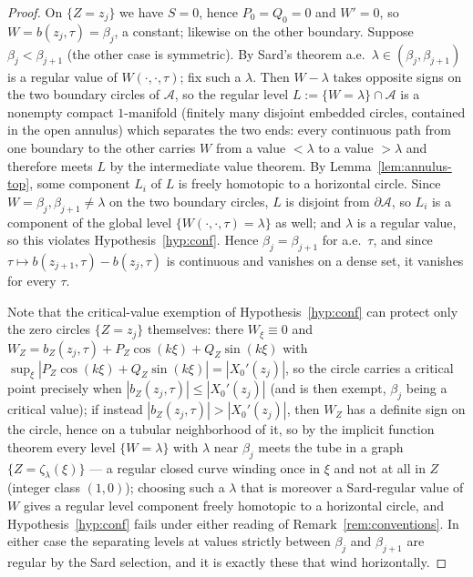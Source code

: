 \documentclass[11pt]{amsart}
\theoremstyle{definition}
\theoremstyle{remark}
\begin{document}
\begin{proof}
On $\{Z=z_j\}$ we have $S=0$, hence $P_0=Q_0=0$ and $W'=0$, so
$W=b(z_j,\tau)=\beta_j$, a constant; likewise on the other boundary.
Suppose $\beta_j<\beta_{j+1}$ (the other case is symmetric). By Sard's
theorem a.e.\ $\lambda\in(\beta_j,\beta_{j+1})$ is a regular value of
$W(\cdot,\cdot,\tau)$; fix such a $\lambda$. Then $W-\lambda$ takes
opposite signs on the two boundary circles of $\mathcal A$, so the
regular level $L:=\{W=\lambda\}\cap\mathcal A$ is a nonempty compact
$1$-manifold (finitely many disjoint embedded circles, contained in the
open annulus) which separates the two ends: every continuous path from
one boundary to the other carries $W$ from a value $<\lambda$ to a
value $>\lambda$ and therefore meets $L$ by the intermediate value
theorem. By Lemma~\ref{lem:annulus-top}, some component $L_i$ of $L$ is
freely homotopic to a horizontal circle. Since $W=\beta_j,\beta_{j+1}
\neq\lambda$ on the two boundary circles, $L$ is disjoint from
$\partial\mathcal A$, so $L_i$ is a component of the global level
$\{W(\cdot,\cdot,\tau)=\lambda\}$ as well; and $\lambda$ is a
regular value, so this violates Hypothesis~\ref{hyp:conf}. Hence
$\beta_j=\beta_{j+1}$ for a.e.\ $\tau$, and since
$\tau\mapsto b(z_{j+1},\tau)-b(z_j,\tau)$ is continuous and vanishes on
a dense set, it vanishes for every $\tau$.

Note that the critical-value exemption of Hypothesis~\ref{hyp:conf} can
protect only the zero circles $\{Z=z_j\}$ themselves: there
$W_\xi\equiv0$ and
$W_Z=b_Z(z_j,\tau)+P_Z\cos(k\xi)+Q_Z\sin(k\xi)$ with
$\sup_\xi|P_Z\cos(k\xi)+Q_Z\sin(k\xi)|=|X_0'(z_j)|$, so the circle
carries a critical point precisely when
$|b_Z(z_j,\tau)|\le|X_0'(z_j)|$ (and is then exempt, $\beta_j$ being a
critical value); if instead $|b_Z(z_j,\tau)|>|X_0'(z_j)|$, then $W_Z$
has a definite sign on the circle, hence on a tubular neighborhood of
it, so by the implicit function theorem every level $\{W=\lambda\}$
with $\lambda$ near $\beta_j$ meets the tube in a graph
$\{Z=\zeta_\lambda(\xi)\}$ --- a regular closed curve winding once in
$\xi$ and not at all in $Z$ (integer class $(1,0)$); choosing such a
$\lambda$ that is moreover a Sard-regular value of $W$ gives a regular
level component freely homotopic to a horizontal circle, and
Hypothesis~\ref{hyp:conf} fails under either reading of
Remark~\ref{rem:conventions}. In either case the separating levels at
values strictly between $\beta_j$ and $\beta_{j+1}$ are regular by the
Sard selection, and it is exactly these that wind horizontally.
\end{proof}
\end{document}
